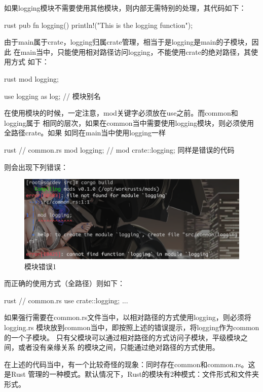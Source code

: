 如果logging模块不需要使用其他模块，则内部无需特别的处理，其代码如下：
\begin{code-block}{rust}
pub fn logging() {
    println!("This is the logging function");
}
\end{code-block}
由于main属于crate，logging归属crate管理，相当于是logging是main的子模块，因此
在main当中，只能使用相对路径访问logging，不能使用crate的绝对路径，其使用方式
如下：
\begin{code-block}{rust}
mod logging;

use logging as log; // 模块别名
\end{code-block}
在使用模块的时候，一定注意，mod关键字必须放在use之前。而common和logging属于
相同的层次，如果在common当中需要使用logging模块，则必须使用全路径crate。如果
如同在main当中使用logging一样
\begin{code-block}{rust}
// common.rs
mod logging;
// mod crate::logging; 同样是错误的代码
\end{code-block}
则会出现下列错误：
\begin{figure}[H]
  \centering
  \includegraphics[width=\linewidth]{rust_mod_error1.png}
  \caption{模块错误1}
  \label{fig:rust_mod_error1}
\end{figure}
而正确的使用方式（全路径）则如下：
\begin{code-block}{rust}
// common.rs
use crate::logging;
...
\end{code-block}

如果强行需要在common.rs文件当中，以相对路径的方式使用logging，则必须将logging.rs
模块放到common当中，即按照上述的错误提示，将logging作为common的一个子模块。
只有父模块可以通过相对路径的方式访问子模块，平级模块之间，或者没有亲缘关系
的模块之间，只能通过绝对路径的方式使用。

在上述的代码当中，有一个比较奇怪的现象：同时存在common和common.rs。这是Rust
管理的一种模式。默认情况下，Rust的模块有2种模式：文件形式和文件夹形式。

